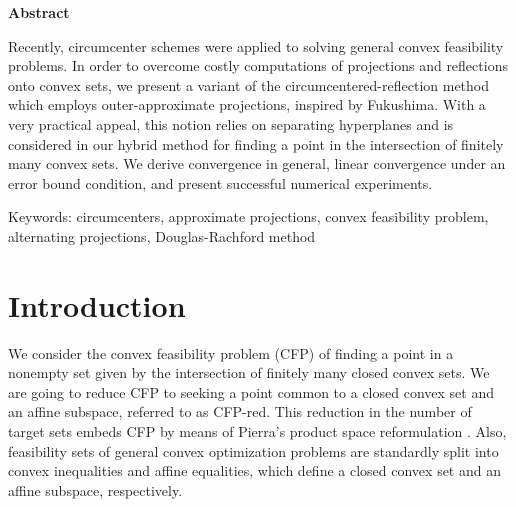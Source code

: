 \documentclass[smallextended,numbook,nospthms]{svjour3}
\theoremstyle{plain}
\theoremstyle{definition}
\begin{document}
\thispagestyle{empty}


\newpage

\thispagestyle{empty}


\thispagestyle{empty}

\newpage
\begin{center}
\textbf{\normalsize Abstract}
\end{center}
\vspace{1pt}

Recently, circumcenter schemes were  applied to solving general convex feasibility problems. In order to overcome costly computations of projections and reflections onto convex sets, we present a variant of the circumcentered-reflection method which employs outer-approximate projections, inspired by Fukushima.
With a very practical appeal, this  notion relies on separating hyperplanes and is considered in our hybrid method for finding a point in the intersection of finitely many convex sets.  We derive convergence in general, linear convergence under an error bound condition, and present successful numerical experiments.

Keywords: circumcenters, approximate projections, convex feasibility problem, alternating projections, Douglas-Rachford method

\newpage
\thispagestyle{empty}

\listoffigures

\listoftables

\newpage

\thispagestyle{empty}

\newpage
\tableofcontents
\thispagestyle{empty}

\newpage
\section{Introduction}
We consider the convex feasibility problem (CFP) of finding a point in a nonempty set given by the intersection of finitely many closed convex sets. We are going to reduce CFP to seeking a point common to a closed convex set and an affine subspace, referred to as CFP-red. This reduction in the number of target sets embeds CFP by means of Pierra's product space reformulation \cite{Pierra:1984hl}. Also, feasibility sets of general convex optimization problems are standardly split into convex inequalities and affine equalities, which define a closed convex set and an affine subspace, respectively.
\end{document}
